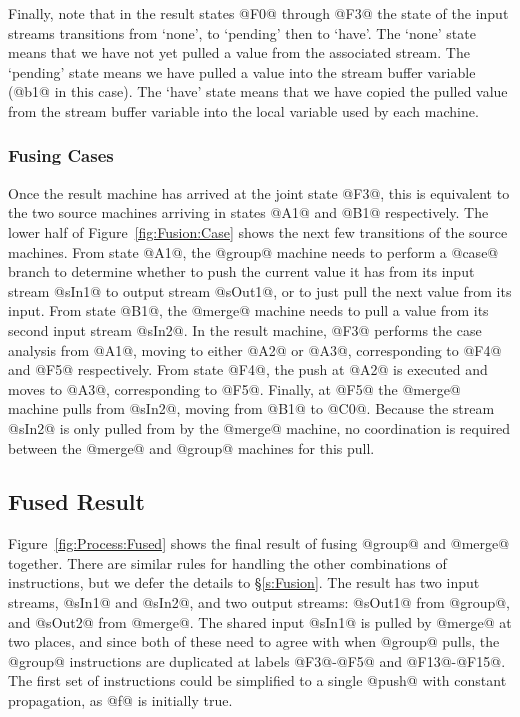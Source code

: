 Finally, note that in the result states @F0@ through @F3@ the state of the input streams transitions from `none', to `pending' then to `have'. The `none' state means that we have not yet pulled a value from the associated stream. The `pending' state means we have pulled a value into the stream buffer variable (@b1@ in this case). The `have' state means that we have copied the pulled value from the stream buffer variable into the local variable used by each machine. 



\subsubsection{Fusing Cases}
Once the result machine has arrived at the joint state @F3@, this is equivalent to the two source machines arriving in states @A1@ and @B1@ respectively. The lower half of Figure~\ref{fig:Fusion:Case} shows the next few transitions of the source machines. From state @A1@, the @group@ machine needs to perform a @case@ branch to determine whether to push the current value it has from its input stream @sIn1@ to output stream @sOut1@, or to just pull the next value from its input. From state @B1@, the @merge@ machine needs to pull a value from its second input stream @sIn2@. In the result machine, @F3@ performs the case analysis from @A1@, moving to either @A2@ or @A3@, corresponding to @F4@ and @F5@ respectively. From state @F4@, the push at @A2@ is executed and moves to @A3@, corresponding to @F5@. Finally, at @F5@ the @merge@ machine pulls from @sIn2@, moving from @B1@ to @C0@. Because the stream @sIn2@ is only pulled from by the @merge@ machine, no coordination is required between the @merge@ and @group@ machines for this pull.


\subsection{Fused Result}

Figure~\ref{fig:Process:Fused} shows the final result of fusing @group@ and @merge@ together. There are similar rules for handling the other combinations of instructions, but we defer the details to \S\ref{s:Fusion}.
The result has two input streams, @sIn1@ and @sIn2@, and two output streams: @sOut1@ from @group@, and @sOut2@ from @merge@. 
The shared input @sIn1@ is pulled by @merge@ at two places, and since both of these need to agree with when @group@ pulls, the @group@ instructions are duplicated at labels @F3@-@F5@ and @F13@-@F15@. The first set of instructions could be simplified to a single @push@ with constant propagation, as @f@ is initially true.

